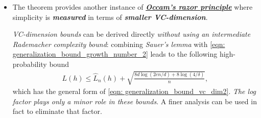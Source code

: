 \documentclass[11pt]{article}
\begin{document}
\begin{itemize}
\item \begin{remark}
The theorem provides another instance of \underline{\emph{\textbf{Occam's razor principle}}} where simplicity is \emph{\textbf{measured}} in terms of \emph{\textbf{smaller VC-dimension}}.

\emph{VC-dimension bounds} can be derived directly \emph{without using an intermediate Rademacher complexity bound}: combining \emph{Sauer’s lemma} with \eqref{eqn: generalization_bound_growth_number_2} leads to the following high-probability bound
\begin{align}
L(h) \le \widehat{L}_{n}(h) + \sqrt{\frac{8d\log(2en /d) + 8\log(4/\delta)}{n}},  \label{eqn: generalization_bound_vc_dim3}
\end{align}
which has the general form of \eqref{eqn: generalization_bound_vc_dim2}. \emph{The log factor plays only a minor role in these bounds}. A finer analysis can be used in fact to eliminate that factor.
\end{remark}

\end{itemize}
\end{document}
